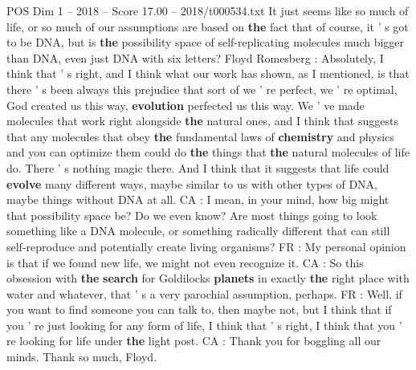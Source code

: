 \begin{textsample}{POS Dim 1 – 2018 – Score 17.00 – 2018/t000534.txt}
It just seems like so much of life, or so much of our assumptions are based on \textbf{the} fact that of course, it ' s got to be DNA, but is \textbf{the} possibility space of self-replicating molecules much bigger than DNA, even just DNA with six letters?
Floyd Romesberg : Absolutely, I think that ' s right, and I think what our work has shown, as I mentioned, is that there ' s been always this prejudice that sort of we ' re perfect, we ' re optimal, God created us this way, \textbf{evolution} perfected us this way.
We ' ve made molecules that work right alongside \textbf{the} natural ones, and I think that suggests that any molecules that obey \textbf{the} fundamental laws of \textbf{chemistry} and physics and you can optimize them could do \textbf{the} things that \textbf{the} natural molecules of life do.
There ' s nothing magic there.
And I think that it suggests that life could \textbf{evolve} many different ways, maybe similar to us with other types of DNA, maybe things without DNA at all.
CA : I mean, in your mind, how big might that possibility space be?
Do we even know?
Are most things going to look something like a DNA molecule, or something radically different that can still self-reproduce and potentially create living organisms?
FR : My personal opinion is that if we found new life, we might not even recognize it.
CA : So this obsession with \textbf{the} \textbf{search} for Goldilocks \textbf{planets} in exactly \textbf{the} right place with water and whatever, that ' s a very parochial assumption, perhaps.
FR : Well, if you want to find someone you can talk to, then maybe not, but I think that if you ' re just looking for any form of life, I think that ' s right, I think that you ' re looking for life under \textbf{the} light post.
CA : Thank you for boggling all our minds.
Thank so much, Floyd.

\end{textsample}
